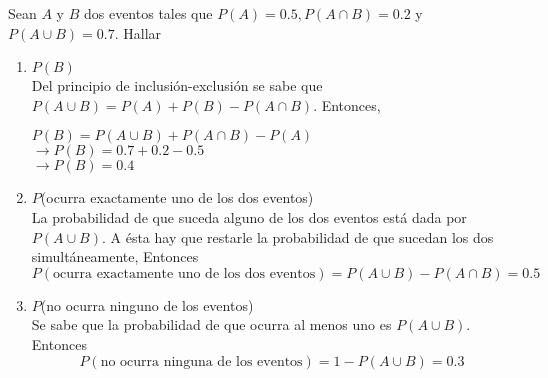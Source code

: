 \item Sean $A$ y $B$ dos eventos tales que $P(A)=0.5,P(A\cap B)=0.2$ y $P(A\cup B)=0.7$. Hallar
    \begin{enumerate}
        \item $P(B)$\e\\
            Del principio de inclusión-exclusión se sabe que $P(A\cup B)=P(A)+P(B)-P(A\cap B)$. Entonces,\begin{center}
                $P(B)=P(A\cup B)+P(A\cap B)-P(A)$\\
                $\to P(B)=0.7+0.2-0.5$\\
                $\to P(B)=0.4$    
            \end{center}
        \item $P$(ocurra exactamente uno de los dos eventos)\e\\
            La probabilidad de que suceda alguno de los dos eventos está dada por $P(A\cup B)$. A ésta hay que restarle la probabilidad de que sucedan los dos simultáneamente, Entonces\[P(\text{ocurra exactamente uno de los dos eventos})=P(A\cup B)-P(A\cap B)=0.5\]
        \item $P$(no ocurra ninguno de los eventos)\e\\
            Se sabe que la probabilidad de que ocurra al menos uno es $P(A\cup B)$. Entonces\[P(\text{no ocurra ninguna de los eventos})=1-P(A\cup B)=0.3\]
    \end{enumerate}